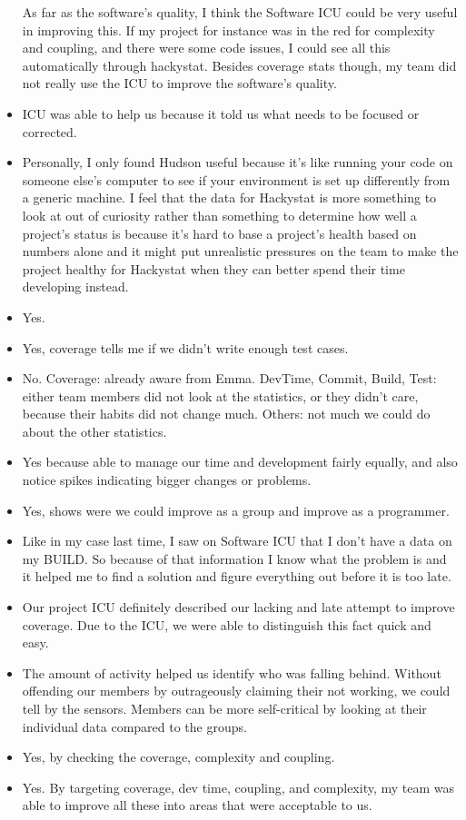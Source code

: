 \documentclass[11pt]{article}
\begin{document}
\begin{itemize}
As far as the software's quality, I think the Software ICU could be very useful in improving this. If my project for instance was in the red for complexity and coupling, and there were some code issues, I could see all this automatically through hackystat. Besides coverage stats though, my team did not really use the ICU to improve the software's quality.
\item ICU was able to help us because it told us what needs to be focused or corrected.
\item Personally, I only found Hudson useful because it's like running your code on someone else's computer to see if your environment is set up differently from a generic machine. I feel that the data for Hackystat is more something to look at out of curiosity rather than something to determine how well a project's status is because it's hard to base a project's health based on numbers alone and it might put unrealistic pressures on the team to make the project healthy for Hackystat when they can better spend their time developing instead.
\item Yes.
\item Yes, coverage tells me if we didn't write enough test cases.
\item No.  
Coverage: already aware from Emma.  
DevTime, Commit, Build, Test: either team members did not look at the statistics, or they didn't care, because their habits did not change much.
Others: not much we could do about the other statistics.
\item Yes because able to manage our time and development fairly equally, and also notice spikes indicating bigger changes or problems.
\item Yes, shows were we could improve as a group and improve as a programmer.
\item Like in my case last time, I saw on Software ICU that I don't have a data on my BUILD. So because of that information I know what the problem is and it helped me to find a solution and figure everything out before it is too late.
\item Our project ICU definitely described our lacking and late attempt to improve coverage. Due to the ICU, we were able to distinguish this fact quick and easy. 
\item The amount of activity helped us identify who was falling behind.  Without offending our members by outrageously claiming their not working, we could tell by the sensors.  Members can be more self-critical by looking at their individual data compared to the groups.
\item Yes, by checking the coverage, complexity and coupling.
\item Yes.  By targeting coverage, dev time, coupling, and complexity, my team was able to improve all these into areas that were acceptable to us.
\end{itemize}
\end{document}

